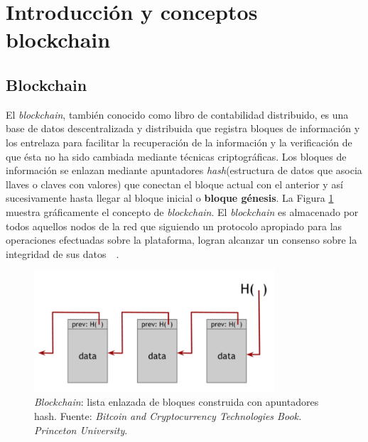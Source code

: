 \graphicspath{ {Figs/Chapter2/} }

\section {Introducción y conceptos blockchain}  %

\subsection{Blockchain}


El  \textit{blockchain}, también conocido como libro de contabilidad distribuido, es una base de datos descentralizada y distribuida que registra bloques de información y los entrelaza para facilitar la recuperación de la información y la verificación de que ésta no ha sido cambiada mediante técnicas criptográficas. Los bloques de información se enlazan mediante apuntadores {\it hash}(estructura de datos que asocia llaves o claves con valores) que conectan el bloque actual con el anterior y así sucesivamente hasta llegar al bloque inicial o \textbf{bloque génesis}. La Figura \ref{blockchain_linkedlist} muestra gráficamente el concepto de \textit{blockchain}.
El \textit{blockchain} es almacenado por todos aquellos nodos de la red que siguiendo un protocolo apropiado para las operaciones efectuadas sobre la plataforma, logran alcanzar un consenso sobre la integridad de sus datos~\cite{staff2016blockchains}~\cite{neittaanmaki2016blockchain}.

\begin{figure}[H]
    \centering
    \includegraphics[width=0.8\textwidth]{cadena_de_bloques.png}
     \caption{\textit{Blockchain}: lista enlazada de bloques construida con apuntadores hash. Fuente: \textit{Bitcoin and Cryptocurrency Technologies Book. Princeton University}.\cite{narayanan2016bitcoin}}
    \label{blockchain_linkedlist}
\end{figure}



